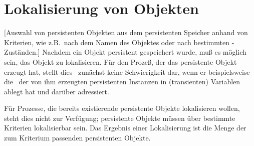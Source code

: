 \section{Lokalisierung von Objekten}%
%
[{Auswahl von persistenten
Objekten aus dem persistenten Speicher anhand von Kriterien, wie
z.B.\ nach dem Namen des Objektes oder nach bestimmten
\protect\Slt\/-Zust\"{a}nden.}]%
%
Nachdem ein Objekt persistent gespeichert wurde, mu\ss{} es 
m\"{o}glich sein, das Objekt zu lokalisieren. F\"{u}r den Proze\ss{}, der das
persistente Objekt erzeugt hat, stellt dies \ia\ zun\"{a}chst
keine Schwierigkeit dar, wenn er beispielsweise die \objid[s]\ der von
ihm erzeugten persistenten Instanzen in (transienten) Variablen
ablegt hat und dar\"{u}ber adressiert.
%
\par{}F\"{u}r Prozesse, die bereits existierende persistente Objekte
lokalisieren wollen, steht dies nicht zur Verf\"{u}gung; persistente
Objekte m\"{u}ssen \"{u}ber bestimmte Kriterien lokalisierbar sein. Das
Ergebnis einer Lokalisierung ist die Menge der zum Kriterium
passenden persistenten Objekte.
%
